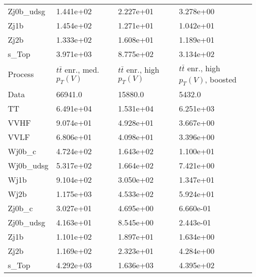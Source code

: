 \begin{table}
{\begin{tabularx}{0.8\textwidth}{|X|X|X|X|}
Zj0b\_udsg & 1.441e+02 & 2.227e+01 & 3.278e+00 \\
Zj1b & 1.454e+02 & 1.271e+01 & 1.042e+01 \\
Zj2b & 1.333e+02 & 1.608e+01 & 1.189e+01 \\
s\_Top & 3.971e+03 & 8.775e+02 & 3.134e+02 \\
\hline
\hline
Process & $t\bar{t}$ enr., med. $p_{T}(V)$ & $t\bar{t}$ enr., high $p_{T}(V)$ & $t\bar{t}$ enr., high $p_{T}(V)$, boosted \\
\hline
Data & 66941.0 & 15880.0 & 5432.0 \\
\hline
TT & 6.491e+04 & 1.531e+04 & 6.251e+03 \\
VVHF & 9.074e+01 & 4.928e+01 & 3.667e+00 \\
VVLF & 6.806e+01 & 4.098e+01 & 3.396e+00 \\
Wj0b\_c & 4.724e+02 & 1.643e+02 & 1.100e+01 \\
Wj0b\_udsg & 5.317e+02 & 1.664e+02 & 7.421e+00 \\
Wj1b & 9.104e+02 & 3.050e+02 & 1.347e+01 \\
Wj2b & 1.175e+03 & 4.533e+02 & 5.924e+01 \\
Zj0b\_c & 3.027e+01 & 4.695e+00 & 6.660e-01 \\
Zj0b\_udsg & 4.163e+01 & 8.545e+00 & 2.443e-01 \\
Zj1b & 1.101e+02 & 1.897e+01 & 1.634e+00 \\
Zj2b & 1.169e+02 & 2.323e+01 & 4.284e+00 \\
s\_Top & 4.292e+03 & 1.636e+03 & 4.395e+02 \\
\hline
\end{tabularx}
}
\label{tab:cr-Wen-2018}
\end{table}

